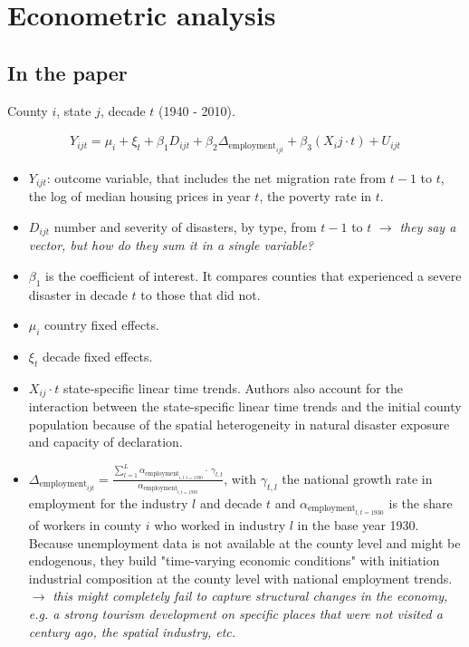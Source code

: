 \documentclass[11pt, oneside]{article}   	%
\begin{document}
\section{Econometric analysis}
\subsection{In the paper}
County $i$, state $j$, decade $t$ (1940 - 2010).

\begin{align*}
    Y_{ijt} = \mu_i + \xi_t + \beta_1 D_{ijt} + \beta_2 \Delta_{\text{employment}_{ijt}} + \beta_3 (X_ij \cdot t) + U_{ijt}
\end{align*}

\begin{itemize}
    \item $Y_{ijt}$: outcome variable, that includes the net migration rate from $t-1$ to $t$, the log of median housing prices in year $t$, the poverty rate in $t$.
    \item $D_{ijt}$ number and severity of disasters, by type, from $t-1$ to $t$ $\to$ \textit{they say a vector, but how do they sum it in a single variable?}
    \item $\beta_1$ is the coefficient of interest. It compares counties that experienced a severe disaster in decade $t$ to those that did not.
    \item $\mu_i$ country fixed effects.
    \item $\xi_t$ decade fixed effects.
    \item $X_{ij} \cdot t$ state-specific linear time trends. Authors also account for the interaction between the state-specific linear time trends and the initial county population because of the spatial heterogeneity in natural disaster exposure and capacity of declaration.
    \item $\Delta_{\text{employment}_{ijt}} = \frac{\sum_{l = 1}^L \alpha_{\text{employment}_{i,l, t = 1930}} \cdot~\gamma_{l,t}}{\alpha_{\text{employment}_{l, t = 1930}}}$, with $\gamma_{t,l}$ the national growth rate in employment for the industry $l$ and decade $t$ and $\alpha_{\text{employment}_{l, t = 1930}}$ is the share of workers in county $i$ who worked in industry $l$ in the base year 1930. Because unemployment data is not available at the county level and might be endogenous, they build "time-varying economic conditions" with initiation industrial composition at the county level with national employment trends. $\to$ \textit{this might completely fail to capture structural changes in the economy, e.g. a strong tourism development on specific places that were not visited a century ago, the spatial industry, etc.}
\end{itemize}
\end{document}
